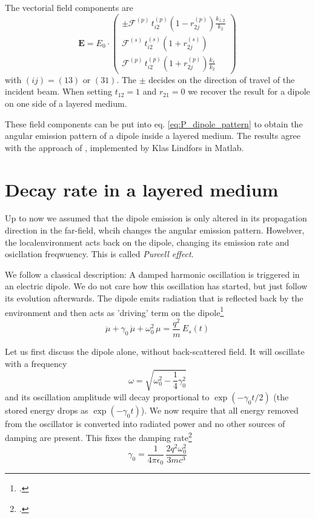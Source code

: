 The vectorial field components are 
\begin{equation}
\mathbf{E} =  
 E_0 \cdot
\begin{pmatrix}
 \pm \mathcal{F}^{(p)} \,  t_{i2}^{(p)}  \left( 1 - r_{2j}^{(p)} \right) \frac{k_{z,2} }{ k_2} \\
\mathcal{F}^{(s)}  \, t_{i2}^{(s)}  \left( 1 + r_{2j}^{(s)} \right)  \\
\mathcal{F}^{(p)}  \, t_{i2}^{(p)}  \left( 1 + r_{2j}^{(p)} \right) \frac{k_{x} }{ k_2}
\end{pmatrix}
\end{equation}
with $(ij) = (13)$ or $(31)$. The $\pm$ decides on the direction of travel of the incident beam. When setting $t_{12} = 1$ and $r_{21} = 0$ we recover the result for a dipole on one side of a layered medium.

These field components can be put into eq. \ref{eq:P_dipole_pattern} to obtain the angular emission pattern of a dipole inside a layered medium. The results agree with the approach of \cite{Polerecky00}, implemented by Klas Lindfors in Matlab.



\section{Decay rate in a layered medium}

Up to now we assumed that the dipole emission is only altered in its propagation direction in the far-field, whcih changes the angular emission pattern. Howebver, the localenvironment acts back on the dipole, changing its emission rate and osicllation freqwuency. This is called \emph{Purcell effect}.


We follow a classical description: A damped harmonic oscillation is triggered in an electric dipole. We do not care how this oscillation has started, but just follow its evolution afterwards. The dipole emits radiation that is reflected back by the environment and then acts as 'driving' term on the dipole\footcite[chapter 8.5.2]{Novotny-Hecht2012}
\begin{equation}
 \ddot{\mu} + \gamma_0 \, \dot{\mu} + \omega_0^2 \, \mu = \frac{q^2}{m} \, E_s(t)
\end{equation}

Let us first discuss the dipole alone, without back-scattered field. It will oscillate with a frequency
\begin{equation}
 \omega = \sqrt{\omega_0 ^2 - \frac{1}{4} \gamma_0^2}
\end{equation}
and its oscillation amplitude will decay proportional to $\exp(- \gamma_0 t /2)$ (the stored energy drops as $\exp( - \gamma_0 t)$). We now require that all energy removed from the oscillator is converted into radiated power and no other sources of damping are present. This fixes the damping rate\footcite{Novotny-Hecht2012}
\begin{equation}
\gamma_0 = \frac{1}{4  \pi  \epsilon_0} \, \frac{2 q^2 \omega_0^2}{3 m c^3}
\end{equation}

